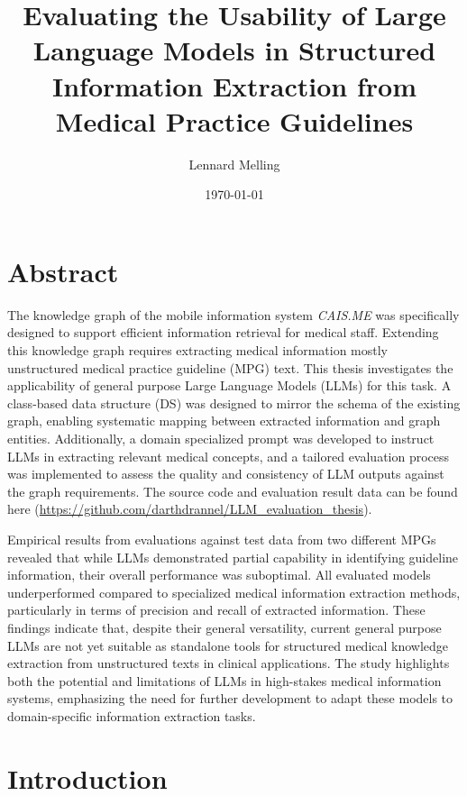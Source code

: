 \documentclass[bs, english]{stthesis}
\title{Evaluating the Usability of Large Language Models in
Structured Information Extraction from Medical Practice Guidelines}
\author{Lennard Melling}
\date{\today}
\begin{document}
\maketitle %

\chapter*{Abstract}
The knowledge graph of the mobile information system \textit{CAIS.ME} was specifically designed to support efficient information retrieval for medical staff. Extending this knowledge graph requires extracting medical information mostly unstructured medical practice guideline (MPG) text. 
This thesis investigates the applicability of general purpose Large Language Models (LLMs) for this task. A class-based data structure (DS) was designed to mirror the schema of the existing graph, enabling systematic mapping between extracted information and graph entities. Additionally, a domain specialized prompt was developed to instruct LLMs in extracting relevant medical concepts, and a tailored evaluation process was implemented to assess the quality and consistency of LLM outputs against the graph requirements. The source code and evaluation result data can be found here (\url{https://github.com/darthdrannel/LLM_evaluation_thesis}).

Empirical results from evaluations against test data from two different MPGs revealed that while LLMs demonstrated partial capability in identifying guideline information, their overall performance was suboptimal. All evaluated models underperformed compared to specialized medical information extraction methods, particularly in terms of precision and recall of extracted information. These findings indicate that, despite their general versatility, current general purpose LLMs are not yet suitable as standalone tools for structured medical knowledge extraction from unstructured texts in clinical applications. The study highlights both the potential and limitations of LLMs in high-stakes medical information systems, emphasizing the need for further development to adapt these models to domain-specific information extraction tasks.



\tableofcontents


\chapter{Introduction}
\end{document}
